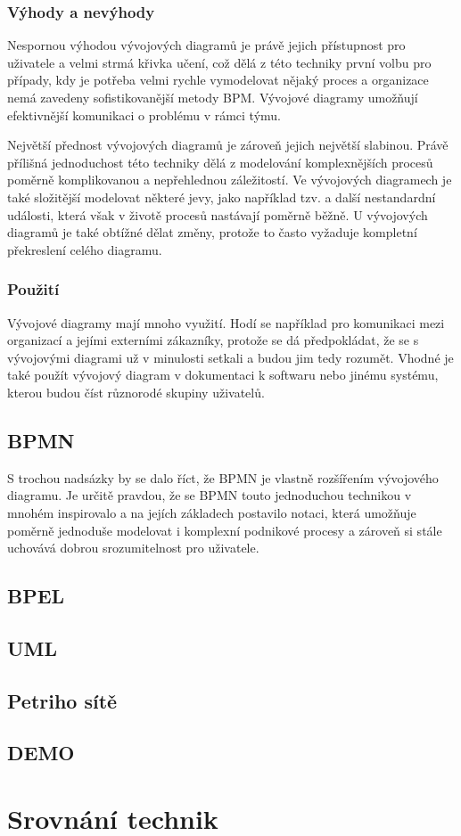 \documentclass[]{article}
\begin{document}
\subsubsection{Výhody a nevýhody}
Nespornou výhodou vývojových diagramů je právě jejich přístupnost pro uživatele a velmi strmá křivka učení, což dělá z této techniky první volbu pro případy, kdy je potřeba velmi rychle vymodelovat nějaký proces a organizace nemá zavedeny sofistikovanější metody BPM. Vývojové diagramy umožňují efektivnější komunikaci o problému v rámci týmu. 

Největší přednost vývojových diagramů je zároveň jejich největší slabinou. Právě přílišná jednoduchost této techniky dělá z modelování komplexnějších procesů poměrně komplikovanou a nepřehlednou záležitostí. Ve vývojových diagramech je také složitější modelovat některé jevy, jako například tzv.  a další nestandardní události, která však v životě procesů nastávají poměrně běžně. U vývojových diagramů je také obtížné dělat změny, protože to často vyžaduje kompletní překreslení celého diagramu.

\subsubsection{Použití}
Vývojové diagramy mají mnoho využití. Hodí se například pro komunikaci mezi organizací a jejími externími zákazníky, protože se dá předpokládat, že se s vývojovými diagrami už v minulosti setkali a budou jim tedy rozumět. Vhodné je také použít vývojový diagram v dokumentaci k softwaru nebo jinému systému, kterou budou číst různorodé skupiny uživatelů.

\subsection{BPMN}
S trochou nadsázky by se dalo říct, že BPMN je vlastně rozšířením vývojového diagramu. Je určitě pravdou, že se BPMN touto jednoduchou technikou v mnohém inspirovalo a na jejích základech postavilo notaci, která umožňuje poměrně jednoduše modelovat i komplexní podnikové procesy a zároveň si stále uchovává dobrou srozumitelnost pro uživatele.

\subsection{BPEL}
\subsection{UML}
\subsection{Petriho sítě}
\subsection{DEMO}
\section{Srovnání technik}

\nocite{*}


\end{document}
